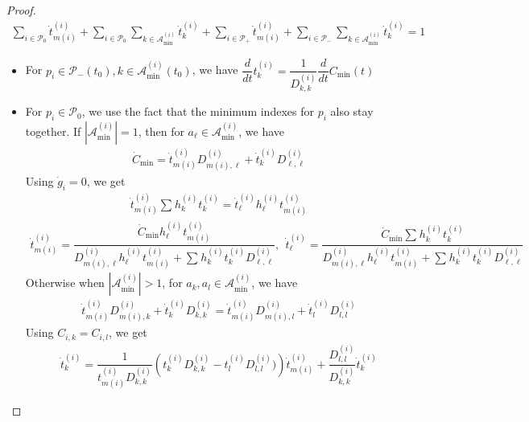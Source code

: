 \documentclass{article}
\begin{document}
\begin{proof}
    \begin{align}
        \sum_{i\in\mathcal{P}_{0}} \dot{t}^{(i)}_{m(i)}+ \sum_{i\in\mathcal{P}_{0}} \sum_{k\in\mathcal{A}^{(i)}_{\min}}\dot{t}^{(i)}_k +\sum_{i\in\mathcal{P}_{+}}\dot{t}^{(i)}_{m(i)}+\sum_{i\in \mathcal{P}_{-}}\sum_{k\in\mathcal{A}^{(i)}_{\min}}\dot{t}^{(i)}_k   = 1 \label{eq:sumtionesided}
    \end{align}
    \begin{itemize}
        \item    For $p_i\in \mathcal{P}_{-}(t_0), k\in\mathcal{A}^{(i)}_{\min}(t_0)$, we have $\dfrac{d}{dt}t^{(i)}_k = \dfrac{1}{D^{(i)}_{k,k}}\dfrac{d}{dt}C_{\min}(t)$
        \item For $p_i\in \mathcal{P}_{0}$, we use the fact that the minimum indexes for $p_i$ also stay together. If $|\mathcal{A}^{(i)}_{\min}|=1$, then for $a_{\ell}\in \mathcal{A}^{(i)}_{\min}$, we have
    \begin{align*}
        \dot{C}_{\min}=\dot{t}^{(i)}_{m(i)}D^{(i)}_{m(i),\ell} + \dot{t}^{(i)}_kD^{(i)}_{\ell,\ell}
    \end{align*}
      Using $\dot{g}_i=0$, we get
    \begin{align*}
        \dot{t}^{(i)}_{m(i)}\sum_{} h^{(i)}_k t^{(i)}_{k}=\dot{t}^{(i)}_{\ell}h^{(i)}_{\ell}t^{(i)}_{m(i)}
    \end{align*}
    \begin{align*}
        \dot{t}^{(i)}_{m(i)} =  \dfrac{\dot{C}_{\min}h^{(i)}_{\ell}t^{(i)}_{m(i)}}{D^{(i)}_{m(i),\ell}h^{(i)}_{\ell}t^{(i)}_{m(i)}+\sum_{} h^{(i)}_k t^{(i)}_{k}D^{(i)}_{\ell,\ell}},\ \ \dot{t}^{(i)}_{\ell} = \dfrac{\dot{C}_{\min}\sum_{} h^{(i)}_k t^{(i)}_{k}}{D^{(i)}_{m(i),\ell}h^{(i)}_{\ell}t^{(i)}_{m(i)}+\sum_{} h^{(i)}_k t^{(i)}_{k}D^{(i)}_{\ell,\ell}}
    \end{align*}
    Otherwise when $|\mathcal{A}^{(i)}_{\min}|>1$, for $a_k,a_l\in\mathcal{A}^{(i)}_{\min}$, we have
    \begin{align*}
    \dot{t}^{(i)}_{m(i)}D^{(i)}_{m(i),k} + \dot{t}^{(i)}_kD^{(i)}_{k,k}= \dot{t}^{(i)}_{m(i)}D^{(i)}_{m(i),l} + \dot{t}^{(i)}_lD^{(i)}_{l,l}
    \end{align*}
    Using $C_{i,k}=C_{i,l}$, we get
    \begin{align*}
        \dot{t}^{(i)}_k = \dfrac{1}{t^{(i)}_{m(i)}D^{(i)}_{k,k}}\left(t^{(i)}_{k}D^{(i)}_{k,k} -t^{(i)}_lD^{(i)}_{l,l})\right)\dot{t}^{(i)}_{m(i)} + \dfrac{D^{(i)}_{l,l}}{D^{(i)}_{k,k}} \dot{t}^{(i)}_k
    \end{align*}
        

\end{itemize}
\end{proof}
\end{document}
